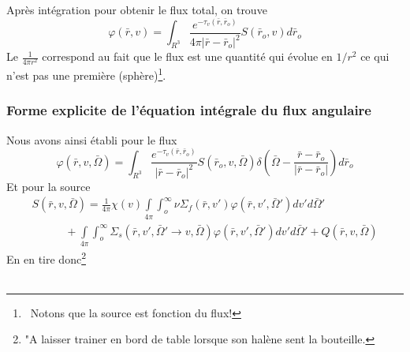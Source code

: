 Après intégration pour obtenir le flux total, on trouve
\begin{equation}
\varphi (\bar r,v) = \int_{{R^3}}^{} {  \frac{{{e^{ - {\tau _v}(\bar r,{{\bar r}_o})}}}}{{4\pi {{\left| {\bar r - {{\bar r}_o}} \right|}^2}}}} S({\bar r_o},v)d{\bar r_o}
\end{equation}
Le $\frac{1}{4\pi r^2}$ correspond au fait que le flux est une quantité qui évolue en $1/r^2$ ce 
qui n'est pas une première (sphère)\footnote{\danger\ Notons que la source est fonction du flux!}.

\subsubsection{Forme explicite de l'équation intégrale du flux angulaire}
Nous avons ainsi établi pour le flux
\begin{equation}
\varphi (\bar r,v,\bar \Omega ) = \int_{{R^3}}^{} {  \frac{{{e^{ - {\tau _v}(\bar r,{{\bar r}_o})}}}}{{{{\left| {\bar r - {{\bar r}_o}} \right|}^2}}}} S({\bar r_o},v,\bar \Omega )\delta \left( {\bar \Omega  - \frac{{\bar r - {{\bar r}_o}}}{{\left| {\bar r - {{\bar r}_o}} \right|}}} \right)d{\bar r_o}
\end{equation}
Et pour la source
\begin{equation}
\begin{array}{l}
S(\bar r,v,\bar \Omega ) = \frac{1}{{4\pi }}\chi (v)\int\limits_{4\pi }    \int_o^\infty     \nu {\Sigma _f}(\bar r,v')\varphi (\bar r,v',\bar \Omega ')dv'd\bar \Omega '\\
\quad \quad \quad  + \int\limits_{4\pi }    \int_o^\infty     {\Sigma _s}(\bar r,v',\bar \Omega ' \to v,\bar \Omega )\varphi (\bar r,v',\bar \Omega ')dv'd\bar \Omega ' + Q(\bar r,v,\bar \Omega )
\end{array}
\end{equation}
En en tire donc\footnote{"A laisser trainer en bord de table lorsque son halène sent la bouteille.}\\

\ \\

